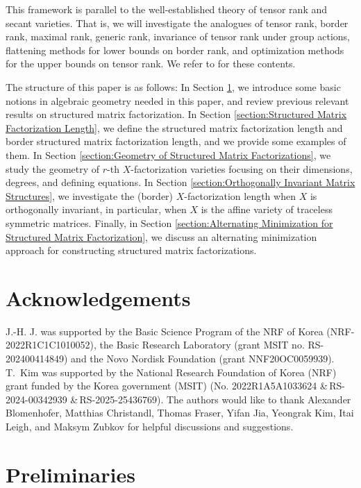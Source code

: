 \documentclass[reqno]{amsart}
\theoremstyle{definition}
\numberwithin{equation}{section}
\begin{document}
This framework is parallel to the well-established theory of tensor rank and secant varieties. That is, we will investigate the analogues of tensor rank, border rank, maximal rank, generic rank, invariance of tensor rank under group actions, flattening methods for lower bounds on border rank, and optimization methods for the upper bounds on tensor rank. We refer to \cite{kolda2009tensor, landsberg2011tensors} for these contents.

The structure of this paper is as follows: In Section \ref{section:Preliminaries}, we introduce some basic notions in algebraic geometry needed in this paper, and review previous relevant results on structured matrix factorization. In Section \ref{section:Structured Matrix Factorization Length}, we define the structured matrix factorization length and border structured matrix factorization length, and we provide some examples of them. In Section \ref{section:Geometry of Structured Matrix Factorizations}, we study the geometry of $r$-th $X$-factorization varieties focusing on their dimensions, degrees, and defining equations. In Section \ref{section:Orthogonally Invariant Matrix Structures}, we investigate the (border) $X$-factorization length when $X$ is orthogonally invariant, in particular, when $X$ is the affine variety of traceless symmetric matrices. Finally, in Section \ref{section:Alternating Minimization for Structured Matrix Factorization}, we discuss an alternating minimization approach for constructing structured matrix factorizations.

\section*{Acknowledgements}

J.-H. J. was supported by the Basic Science Program of the NRF of Korea (NRF-2022R1C1C1010052), the Basic Research Laboratory (grant MSIT no. RS-202400414849) and the Novo Nordisk Foundation (grant NNF20OC0059939). T.~Kim was supported by the National Research Foundation of Korea (NRF) grant funded by the Korea government (MSIT) (No. 2022R1A5A1033624 \&\,RS-2024-00342939 \&\,RS-2025-25436769). The authors would like to thank Alexander Blomenhofer, Matthias Christandl, Thomas Fraser, Yifan Jia, Yeongrak Kim, Itai Leigh, and Maksym Zubkov for helpful discussions and suggestions. 

\section{Preliminaries}\label{section:Preliminaries}
\end{document}

